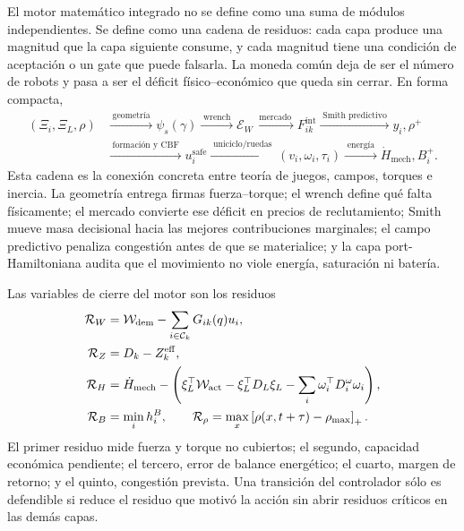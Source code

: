 El motor matemático integrado no se define como una suma de módulos independientes. Se
define como una cadena de residuos: cada capa produce una magnitud que la capa siguiente
consume, y cada magnitud tiene una condición de aceptación o un gate que puede falsarla.
La moneda común deja de ser el número de robots y pasa a ser el déficit físico--económico
que queda sin cerrar. En forma compacta,
\begin{equation}
\begin{aligned}
(\Xi_i,\Xi_L,\rho)
&\xrightarrow{\;\text{geometría}\;}
\psi_s(\gamma)
\xrightarrow{\;\text{wrench}\;}
\mathcal E_W
\xrightarrow{\;\text{mercado}\;}
F_{ik}^{\mathrm{int}}
\xrightarrow{\;\text{Smith predictivo}\;}
y_i,\rho^+ \\
&\xrightarrow{\;\text{formación y CBF}\;}
u_i^{\mathrm{safe}}
\xrightarrow{\;\text{uniciclo/ruedas}\;}
(v_i,\omega_i,\tau_i)
\xrightarrow{\;\text{energía}\;}
\dot H_{\mathrm{mech}},B_i^+ .
\end{aligned}
\label{eq:cadena_motor_integrado}
\end{equation}
Esta cadena es la conexión concreta entre teoría de juegos, campos, torques e inercia.
La geometría entrega firmas fuerza--torque; el wrench define qué falta físicamente; el
mercado convierte ese déficit en precios de reclutamiento; Smith mueve masa decisional
hacia las mejores contribuciones marginales; el campo predictivo penaliza congestión
antes de que se materialice; y la capa port-Hamiltoniana audita que el movimiento no
viole energía, saturación ni batería.

Las variables de cierre del motor son los residuos
\begin{equation}
\begin{aligned}
  \mathcal R_W
  &=
  \mathcal W_{\mathrm{dem}}
  -
  \sum_{i\in\mathcal C_k}G_{ik}(q)u_i,\\
  \mathcal R_Z
  &=
  D_k-Z_k^{\mathrm{eff}},\\
  \mathcal R_H
  &=
  \dot H_{\mathrm{mech}}
  -
  \left(
    \xi_L^\top\mathcal W_{\mathrm{act}}
    -
    \xi_L^\top D_L\xi_L
    -
    \sum_i \omega_i^\top D_i^\omega\omega_i
  \right),\\
  \mathcal R_B
  &=
  \min_i h_i^B,
  \qquad
  \mathcal R_\rho
  =
  \max_x\left[\rho(x,t+\tau)-\rho_{\max}\right]_{+} .
\end{aligned}
\label{eq:residuos_motor_integrado}
\end{equation}
El primer residuo mide fuerza y torque no cubiertos; el segundo, capacidad económica
pendiente; el tercero, error de balance energético; el cuarto, margen de retorno; y el
quinto, congestión prevista. Una transición del controlador sólo es defendible si reduce
el residuo que motivó la acción sin abrir residuos críticos en las demás capas.

